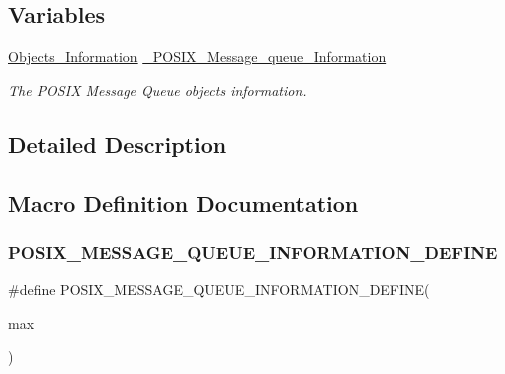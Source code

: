 \subsection*{Variables}
\begin{DoxyCompactItemize}
\item 
\mbox{\label{group__POSIX__MQUEUE__P_ga7a27d06b186a4156cac7851e1dae8c1f}} 
\mbox{\hyperlink{structObjects__Information}{Objects\+\_\+\+Information}} \mbox{\hyperlink{group__POSIX__MQUEUE__P_ga7a27d06b186a4156cac7851e1dae8c1f}{\+\_\+\+P\+O\+S\+I\+X\+\_\+\+Message\+\_\+queue\+\_\+\+Information}}
\begin{DoxyCompactList}\small\item\em The P\+O\+S\+IX Message Queue objects information. \end{DoxyCompactList}\end{DoxyCompactItemize}


\subsection{Detailed Description}


\subsection{Macro Definition Documentation}
\mbox{\label{group__POSIX__MQUEUE__P_ga853d4305df0c19698101bde224806b25}} 
\subsubsection{\texorpdfstring{POSIX\_MESSAGE\_QUEUE\_INFORMATION\_DEFINE}{POSIX\_MESSAGE\_QUEUE\_INFORMATION\_DEFINE}}
{\footnotesize\ttfamily \#define P\+O\+S\+I\+X\+\_\+\+M\+E\+S\+S\+A\+G\+E\+\_\+\+Q\+U\+E\+U\+E\+\_\+\+I\+N\+F\+O\+R\+M\+A\+T\+I\+O\+N\+\_\+\+D\+E\+F\+I\+NE(\begin{DoxyParamCaption}\item[{}]{max }\end{DoxyParamCaption})}

